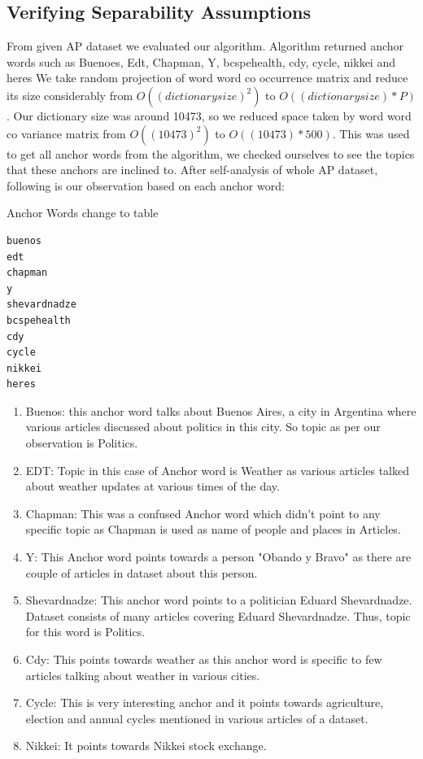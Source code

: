 \documentclass[a4paper,11pt]{article}
\begin{document}
\subsection{Verifying Separability Assumptions}

From given AP dataset we evaluated our algorithm. Algorithm returned anchor words such as Buenoes, Edt, Chapman, Y, bcspehealth, cdy, cycle, nikkei and heres We take random projection of word word co occurrence matrix and reduce its size considerably from $O((dictionary size)^2)$ to $O((dictionary size)*P)$. Our dictionary size was around 10473, so we reduced space taken by word word co variance matrix from $O((10473)^2)$ to $O((10473)*500)$. This was used to get all anchor words from the algorithm, we checked ourselves to see the topics that these anchors are inclined to. After self-analysis of whole AP dataset, following is our observation based on each anchor word:

Anchor Words {\color{orange} change to table}

\begin{verbatim}
buenos
edt
chapman
y
shevardnadze
bcspehealth
cdy
cycle
nikkei
heres
\end{verbatim}

\begin{enumerate}
\item Buenos: this anchor word talks about Buenos Aires, a city in Argentina where various articles discussed about politics in this city. So topic as per our observation is Politics. 

\item EDT: Topic in this case of Anchor word is Weather as various articles talked about weather updates at various times of the day. 

\item Chapman: This was a confused Anchor word which didn't point to any specific topic as Chapman is used as name of people and places in Articles. 

\item Y: This Anchor word points towards a person "Obando y Bravo" as there are couple of articles in dataset about this person. 

\item Shevardnadze: This anchor word points to a politician Eduard Shevardnadze. Dataset consists of many articles covering Eduard Shevardnadze. Thus, topic for this word is Politics. 

\item Cdy: This points towards weather as this anchor word is specific to few articles talking about weather in various cities. 

\item Cycle: This is very interesting anchor and it points towards agriculture, election and annual cycles mentioned in various articles of a dataset. 

\item Nikkei: It points towards Nikkei stock exchange. 

\end{enumerate}
\end{document}
